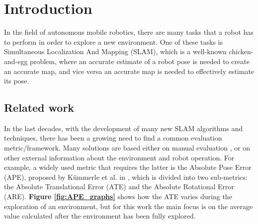 
\section{Introduction} %
In the field of autonomous mobile robotics, there are many tasks that a robot has to perform in order to explore a new environment. One of these tasks is Simultaneous Localization And Mapping (SLAM), which is a well-known chicken-and-egg problem, where an accurate estimate of a robot pose is needed to create an accurate map, and vice versa an accurate map is needed to effectively estimate its pose. 


\subsection{Related work}\label{sec:related} %
In the last decades, with the development of many new SLAM algorithms and techniques, there has been a growing need to find a common evaluation metric/framework. Many solutions are based either on manual evaluation \cite{balaguer2007visualEval}, or on other external information about the environment and robot operation. For example, a widely used metric that requires the latter is the Absolute Pose Error (APE), proposed by Kümmerle et al. in \cite{kummerle2009ATE}, which is divided into two sub-metrics: the Absolute Translational Error (ATE) and the Absolute Rotational Error (ARE). \textbf{Figure \ref{fig:APE_graphs}} shows how the ATE varies during the exploration of an environment, but for this work the main focus is on the average value calculated after the environment has been fully explored.

